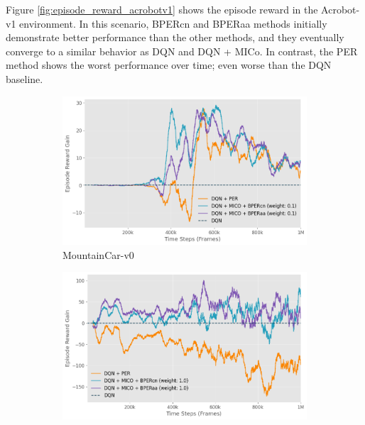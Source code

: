 Figure \ref{fig:episode_reward_acrobotv1} shows the episode reward in the Acrobot-v1 environment. In this scenario, BPERcn and BPERaa methods initially demonstrate better performance than the other methods, and they eventually converge to a similar behavior as DQN and DQN + MICo. In contrast, the PER method shows the worst performance over time; even worse than the DQN baseline. 


\begin{figure}[h]
    \centering
    \begin{subfigure}{0.45\textwidth}
    \includegraphics[width=\linewidth]{Results/general_results/mountain_car_reward_gain_vs_dqn.png}
        \caption{MountainCar-v0}
        \label{fig:mountain_car_reward_gain_vs_dqn}
    \end{subfigure}
    \hfill
    \begin{subfigure}{0.45\textwidth}
        \includegraphics[width=\linewidth]{Results/general_results/lunarlander_reward_gain_vs_dqn.png}

\end{subfigure}
\end{figure}
